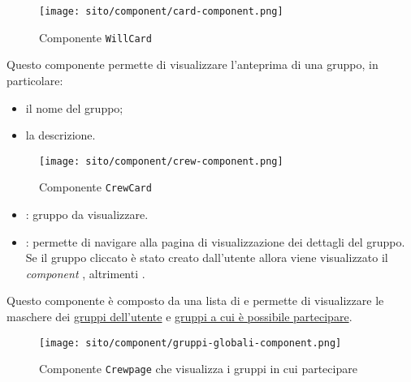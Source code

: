 \begin{figure}[H]
    \centering
    \texttt{[image: sito/component/card-component.png]}
    \caption{Componente \texttt{WillCard}}
\end{figure}

\label{par:CrewCard}
Questo componente permette di visualizzare l'anteprima di una gruppo, in
particolare:
\begin{itemize}
    \item il nome del gruppo;
    \item la descrizione.
\end{itemize}

\begin{figure}[H]
    \centering
    \texttt{[image: sito/component/crew-component.png]}
    \caption{Componente \texttt{CrewCard}}
\end{figure}

\begin{itemize}
    \item {}: gruppo da visualizzare.
\end{itemize}

\begin{itemize}
    \item {}: permette di navigare alla pagina di visualizzazione
          dei dettagli del gruppo. Se il gruppo cliccato è stato creato
          dall'utente
          allora viene visualizzato il \textit{component}
          ,
          altrimenti .
\end{itemize}

\label{par:Crewpage}
Questo componente è composto da una lista di  e permette
di visualizzare le maschere dei \hyperref[par:Gruppi dell'utente]{gruppi
    dell'utente} e \hyperref[par:Gruppi]{gruppi a cui è possibile partecipare}.

\begin{figure}[H]
    \centering
    \texttt{[image: sito/component/gruppi-globali-component.png]}
    \caption{Componente \texttt{Crewpage} che visualizza i gruppi in cui
        partecipare}
\end{figure}

